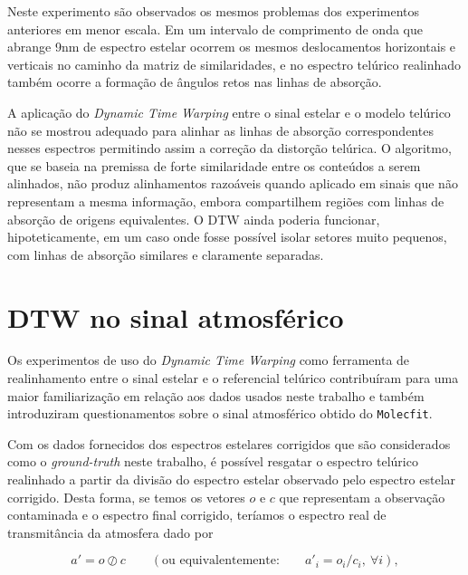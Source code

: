 Neste experimento são observados os mesmos problemas dos experimentos anteriores em menor escala. Em um intervalo de comprimento de onda que abrange 9nm de espectro estelar ocorrem os mesmos deslocamentos horizontais e verticais no caminho da matriz de similaridades, e no espectro telúrico realinhado também ocorre a formação de ângulos retos nas linhas de absorção.

A aplicação do \textit{Dynamic Time Warping} entre o sinal estelar e o modelo telúrico não se mostrou adequado para alinhar as linhas de absorção correspondentes nesses espectros permitindo assim a correção da distorção telúrica. O algoritmo, que se baseia na premissa de forte similaridade entre os conteúdos a serem alinhados, não produz alinhamentos razoáveis quando aplicado em sinais que não representam a mesma informação, embora compartilhem regiões com linhas de absorção de origens equivalentes. O DTW ainda poderia funcionar, hipoteticamente, em um caso onde fosse possível isolar setores muito pequenos, com linhas de absorção similares e claramente separadas.


\section{DTW no sinal atmosférico}

Os experimentos de uso do \textit{Dynamic Time Warping} como ferramenta de realinhamento entre o sinal estelar e o referencial telúrico contribuíram para uma maior familiarização em relação aos dados usados neste trabalho e também introduziram questionamentos sobre o sinal atmosférico obtido do \texttt{Molecfit}.


Com os dados fornecidos dos espectros estelares corrigidos que são considerados como o \textit{ground-truth} neste trabalho, é possível resgatar o espectro telúrico realinhado a partir da divisão do espectro estelar observado pelo espectro estelar corrigido. Desta forma, se temos os vetores $o$ e $c$ que representam a observação contaminada e o espectro final corrigido, teríamos o espectro real de transmitância da atmosfera dado por

\begin{equation*}
    a' = o \oslash c \qquad \left(\mbox{ou equivalentemente:} \qquad a'_{i} = o_i / c_i,\ \forall i\right),
\end{equation*}

